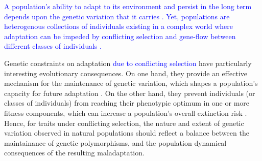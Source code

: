 \documentclass[11pt]{article}
\begin{document}
\textcolor{blue}{A population's ability to adapt to its environment and persist in the long term depends upon the genetic variation that it carries \citep{Fisher1930, Lewontin1975}. Yet, populations are heterogenous collections of individuals existing in a complex world where adaptation can be impeded by conflicting selection and gene-flow between different classes of individuals \citep{Prout2000, CharlesworthHughes2000, ConnallonHall2018}.}

Genetic constraints on adaptation \textcolor{blue}{due to conflicting selection }have particularly interesting evolutionary consequences. On one hand, they provide an effective mechanism for the maintenance of genetic variation, which shapes a population's capacity for future adaptation \citep{Fisher1930, Prout2000, CharlesworthHughes2000, ConnallonHall2018}. On the other hand, they prevent individuals (or classes of individuals) from reaching their phenotypic optimum in one or more fitness components, which can increase a population's overall extinction risk \citep{kokko2003sexy, harts2014demography}. Hence, for traits under conflicting selection, the nature and extent of genetic variation observed in natural populations should reflect a balance between the maintainance of genetic polymorphisms, and the population dynamical consequences of the resulting maladaptation.

\end{document}
